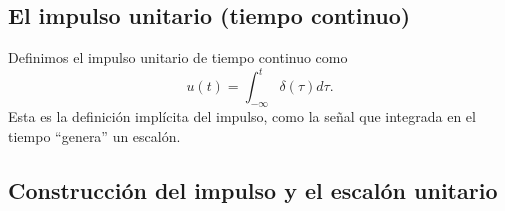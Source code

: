 \subsection{El impulso unitario (tiempo continuo)}

Definimos el impulso unitario de tiempo continuo como
\begin{equation}
  u\left( t\right) =\int_{-\infty }^{t}\delta \left( \tau \right) d\tau . \label{escimpcont}
\end{equation}
Esta es la definici\'{o}n impl\'{i}cita del impulso, como la se\~{n}al
que integrada en el tiempo ``genera'' un escal\'{o}n.

\subsection{Construcci\'{o}n del impulso y el escal\'{o}n unitario}

